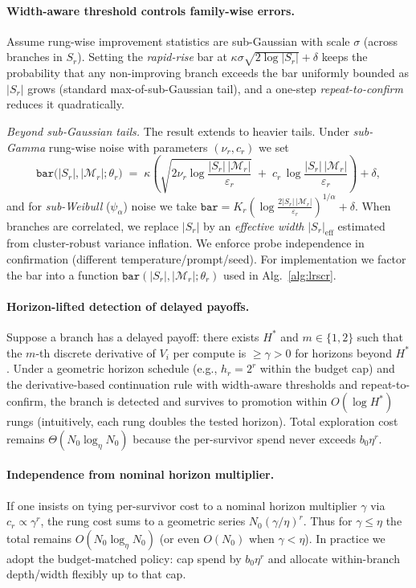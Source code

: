 \documentclass{article}
\begin{document}
\paragraph{Width-aware threshold controls family-wise errors.}
Assume rung-wise improvement statistics are sub-Gaussian with scale $\sigma$ (across branches in $S_r$).
Setting the \emph{rapid-rise} bar at $\kappa\sigma\sqrt{2\log|S_r|}+\delta$ keeps the probability that any non-improving branch exceeds the bar uniformly bounded as $|S_r|$ grows (standard max-of-sub-Gaussian tail), and a one-step \emph{repeat-to-confirm} reduces it quadratically.

\emph{Beyond sub-Gaussian tails.} The result extends to heavier tails.
Under \emph{sub-Gamma} rung-wise noise with parameters $(\nu_r,c_r)$ we set
\begin{equation}
\texttt{bar}\big(|S_r|,|\mathcal{M}_r|;\theta_r\big)\;=\;\kappa\!\left(\sqrt{2\nu_r\log\frac{|S_r|\,|\mathcal{M}_r|}{\varepsilon_r}}\;+\;c_r\,\log\frac{|S_r|\,|\mathcal{M}_r|}{\varepsilon_r}\right)+\delta,
\end{equation}
and for \emph{sub-Weibull} ($\psi_\alpha$) noise we take
$\texttt{bar}=K_r\!\left(\log\frac{2|S_r|\,|\mathcal{M}_r|}{\varepsilon_r}\right)^{1/\alpha}+\delta$.
When branches are correlated, we replace $|S_r|$ by an \emph{effective width} $|S_r|_{\mathrm{eff}}$ estimated from cluster-robust variance inflation.
We enforce probe independence in confirmation (different temperature/prompt/seed).
For implementation we factor the bar into a function $\texttt{bar}(|S_r|,|\mathcal{M}_r|;\theta_r)$ used in Alg.~\ref{alg:lrscr}.

\paragraph{Horizon-lifted detection of delayed payoffs.}
Suppose a branch has a delayed payoff: there exists $H^{*}$ and $m\!\in\!\{1,2\}$ such that the $m$-th discrete derivative of $V_i$ per compute is $\ge \gamma>0$ for horizons beyond $H^{*}$.
Under a geometric horizon schedule (e.g., $h_r=2^r$ within the budget cap) and the derivative-based continuation rule with width-aware thresholds and repeat-to-confirm, the branch is detected and survives to promotion within $O(\log H^{*})$ rungs (intuitively, each rung doubles the tested horizon).
Total exploration cost remains $\Theta(N_0 \log_\eta N_0)$ because the per-survivor spend never exceeds $b_0\eta^r$.

\paragraph{Independence from nominal horizon multiplier.}
If one insists on tying per-survivor cost to a nominal horizon multiplier $\gamma$ via $c_r\propto \gamma^r$, the rung cost sums to a geometric series $N_0(\gamma/\eta)^r$.
Thus for $\gamma\le\eta$ the total remains $O(N_0\log_\eta N_0)$ (or even $O(N_0)$ when $\gamma<\eta$).
In practice we adopt the budget-matched policy: cap spend by $b_0\eta^r$ and allocate within-branch depth/width flexibly up to that cap.
\end{document}
